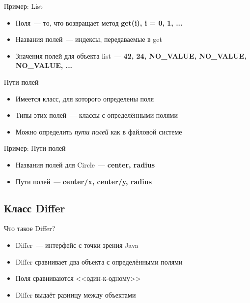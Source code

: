 \documentclass{beamer}
\begin{document}
\begin{frame}{Пример: List}
    \pause
    
    \pause
    \begin{itemize}
        \item {Поля~--- то, что возвращает метод \textbf{get(i), i = 0, 1, ...} \pause}
        \item {Названия полей~--- индексы, передаваемые в get \pause}
        \item {Значения полей для объекта list~--- \textbf{42, 24, NO\_VALUE, NO\_VALUE, NO\_VALUE, ...}}
    \end{itemize}
\end{frame}

\begin{frame}{Пути полей}
    \pause
    \begin{itemize}
        \item {Имеется класс, для которого определены поля \pause}
        \item {Типы этих полей~--- классы с определёнными полями \pause}
        \item {Можно определить \textit{пути полей} как в файловой системе}
    \end{itemize}
\end{frame}

\begin{frame}{Пример: Пути полей}
    \pause
    
    \pause
    \begin{itemize}
        \item {Названия полей для Circle~--- \textbf{center, radius} \pause}
        \item {Пути полей~--- \textbf{center/x, center/y, radius}}
    \end{itemize}
\end{frame}

\subsection{Класс Differ}

\begin{frame}{Что такое Differ?}
    \pause
    \begin{itemize}
        \item {Differ~--- интерфейс с точки зрения Java \pause}
        \item {Differ сравнивает два объекта с определёнными полями \pause}
        \item {Поля сравниваются <<один-к-одному>> \pause}
        \item {Differ выдаёт разницу между объектами}
    \end{itemize}
\end{frame}
\end{document}
